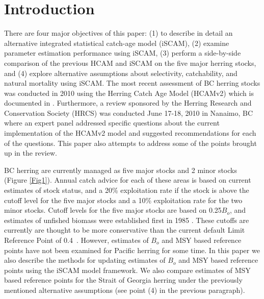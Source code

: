

\section{Introduction}
	
There are four major objectives of this paper: (1) to describe in detail an alternative integrated statistical catch-age model (iSCAM), (2) examine parameter estimation performance using iSCAM, (3) perform a side-by-side comparison of the previous HCAM and iSCAM on the five major herring stocks, and (4) explore alternative assumptions about selectivity, catchability, and natural mortality using iSCAM.  The most recent assessment of BC herring stocks was conducted in 2010 using the Herring Catch Age Model (HCAMv2) which is documented in \cite{Clear2010}.  Furthermore, a review sponsored by the Herring Research and Conservation Society (HRCS) was conducted June 17-18, 2010 in Nanaimo, BC where an expert panel addressed specific questions about the current implementation of the HCAMv2 model and suggested recommendations for each of the questions.  This paper also attempts to address some of the points brought up in the review.

BC herring are currently managed as five major stocks and 2 minor stocks (Figure \ref{Fig1}).  Annual catch advice for each of these areas is based on current estimates of stock status, and a 20\% exploitation rate if the stock is above the cutoff level for the five major stocks and a 10\% exploitation rate for the two minor stocks.  Cutoff levels for the five major stocks are based on 0.25$B_o$, and estimates of unfished biomass were established first in 1985 \citep{haist1986stock}.  These cutoffs are currently are thought to be more conservative 	than the current default Limit Reference Point of 0.4\bmsy\ \citep{dfo2006}. However, estimates of $B_o$ and MSY based reference points have not been examined for Pacific herring for some time.  In this paper we also describe the methods for updating estimates of $B_o$ and MSY based reference points using the iSCAM model framework.  We also compare estimates of MSY based reference points for the Strait of Georgia herring under the previously mentioned alternative assumptions (see point (4) in the previous paragraph).

